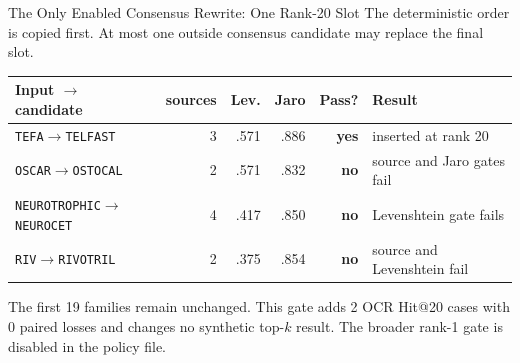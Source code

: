 \documentclass[aspectratio=169,10pt]{beamer}
\newcommand{\code}[1]{\texttt{#1}}
\newcommand{\yes}{\textcolor{A6Green}{\textbf{yes}}}
\newcommand{\no}{\textcolor{A6Red}{\textbf{no}}}
\begin{document}
\begin{frame}{The Only Enabled Consensus Rewrite: One Rank-20 Slot}
\small
The deterministic order is copied first. At most one outside consensus candidate
may replace the final slot.

\begin{center}
\end{center}

\begin{table}
\centering
\scriptsize
\begin{tabular}{@{}lrrrrl@{}}
\toprule
\textbf{Input $\rightarrow$ candidate} & \textbf{sources} & \textbf{Lev.} & \textbf{Jaro} & \textbf{Pass?} & \textbf{Result} \\
\midrule
\code{TEFA}$\rightarrow$\code{TELFAST} & 3 & .571 & .886 & \yes & inserted at rank 20 \\
\code{OSCAR}$\rightarrow$\code{OSTOCAL} & 2 & .571 & .832 & \no & source and Jaro gates fail \\
\code{NEUROTROPHIC}$\rightarrow$\code{NEUROCET} & 4 & .417 & .850 & \no & Levenshtein gate fails \\
\code{RIV}$\rightarrow$\code{RIVOTRIL} & 2 & .375 & .854 & \no & source and Levenshtein fail \\
\bottomrule
\end{tabular}
\end{table}

The first 19 families remain unchanged. This gate adds 2 OCR Hit@20 cases with
0 paired losses and changes no synthetic top-$k$ result. The broader rank-1
gate is disabled in the policy file.
\end{frame}
\end{document}
